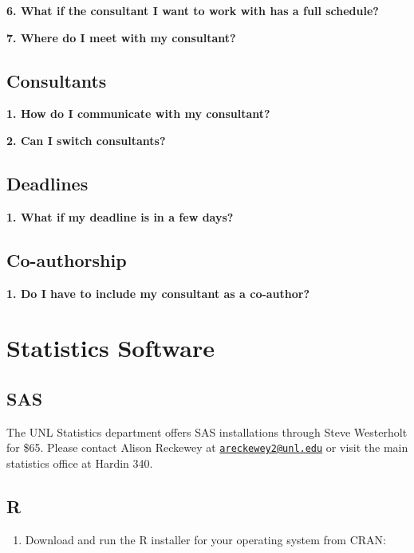 \documentclass[
]{book}
\providecommand{\tightlist}{%
  \setlength{\itemsep}{0pt}\setlength{\parskip}{0pt}}
\begin{document}
\textbf{6. What if the consultant I want to work with has a full schedule?}

\textbf{7. Where do I meet with my consultant?}

\hypertarget{consultants}{%
\section{Consultants}\label{consultants}}

\textbf{1. How do I communicate with my consultant?}

\textbf{2. Can I switch consultants?}

\hypertarget{deadlines}{%
\section{Deadlines}\label{deadlines}}

\textbf{1. What if my deadline is in a few days?}

\hypertarget{co-authorship}{%
\section{Co-authorship}\label{co-authorship}}

\textbf{1. Do I have to include my consultant as a co-author?}

\hypertarget{statistics-software}{%
\chapter{Statistics Software}\label{statistics-software}}

\hypertarget{sas}{%
\section{SAS}\label{sas}}

The UNL Statistics department offers SAS installations through Steve Westerholt for \$65. Please contact Alison Reckewey at \href{mailto:areckewey2@unl.edu}{\nolinkurl{areckewey2@unl.edu}} or visit the main statistics office at Hardin 340.

\hypertarget{r}{%
\section{R}\label{r}}

\begin{enumerate}
\def\labelenumi{\arabic{enumi}.}
\tightlist
\item
  Download and run the R installer for your operating system from CRAN:
\end{enumerate}
\end{document}
